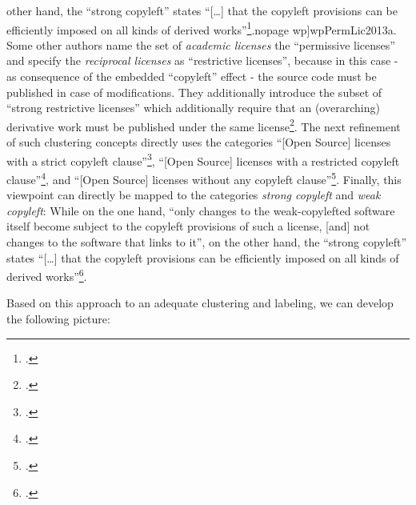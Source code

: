 other hand, the \enquote{strong copyleft} states \enquote{[\ldots] that the
copyleft provisions can be efficiently imposed on all kinds of derived
works}\footcite[cf.][\nopage wp]{wpCopyleft2013a}.nopage wp]{wpPermLic2013a}. Some other authors name
the set of \emph{academic licenses} the \enquote{permissive licenses} and
specify the \emph{reciprocal licenses} as \enquote{restrictive licenses},
because in this case - as consequence of the embedded \enquote{copyleft} effect
- the source code must be published in case of modifications. They additionally
introduce the subset of \enquote{strong restrictive licenses} which additionally
require that an (overarching) derivative work must be published under the same
license\footcite[pars pro toto cf.][57]{Buchtala2007a}. The next refinement of
such clustering concepts directly uses the categories \enquote{[Open Source]
licenses with a strict copyleft clause}\footcite[Originally stated as
\enquote{Lizenzen mit einer strengen Copyleft-Klausel}. Cf.][24]{JaeMet2011a},
\enquote{[Open Source] licenses with a restricted copyleft
clause}\footcite[Originally stated as \enquote{Lizenzen mit einer beschränkten
Copyleft-Klausel}. Cf.][71]{JaeMet2011a}, and \enquote{[Open Source] licenses
without any copyleft clause}\footcite[Originally stated as \enquote{Lizenzen
ohne Copyleft-Klausel}. Cf.][83]{JaeMet2011a}. Finally, this viewpoint can
directly be mapped to the categories \emph{strong copyleft} and \emph{weak
copyleft}: While on the one hand, \enquote{only changes to the weak-copylefted
software itself become subject to the copyleft provisions of such a license,
[and] not changes to the software that links to it}, on the other hand, the
\enquote{strong copyleft} states \enquote{[\ldots] that the copyleft provisions
can be efficiently imposed on all kinds of derived works}\footcite[cf.][\nopage
wp]{wpCopyleft2013a}.

Based on this approach to an adequate clustering and labeling, we can develop
the following picture:

